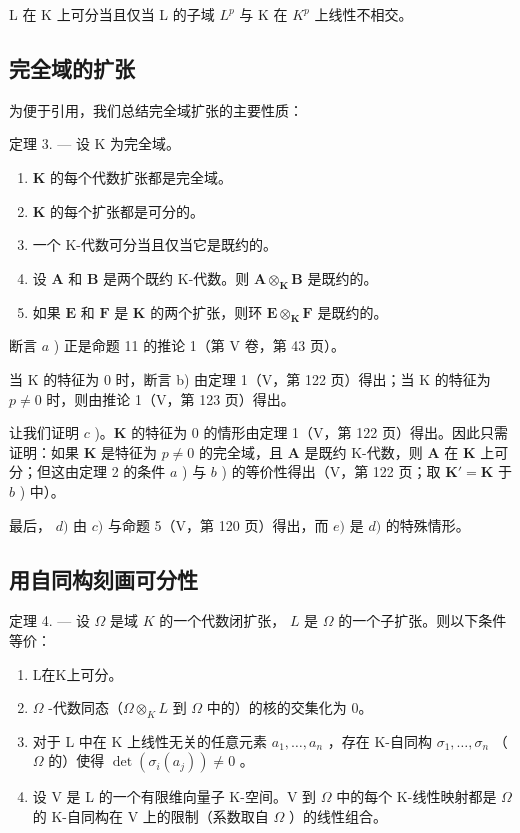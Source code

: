 L 在 K 上可分当且仅当 L 的子域 \(L^{p}\) 与 K 在 \(K^{p}\) 上线性不相交。

\subsection{完全域的扩张}

为便于引用，我们总结完全域扩张的主要性质：

定理 3. --- 设 K 为完全域。

\begin{enumerate}
\def\labelenumi{\alph{enumi})}
\item
  \(\mathbf{K}\) 的每个代数扩张都是完全域。
\item
  \(\mathbf{K}\) 的每个扩张都是可分的。
\item
  一个 K-代数可分当且仅当它是既约的。
\item
  设 \(\mathbf{A}\) 和 \(\mathbf{B}\) 是两个既约 K-代数。则 \(\mathbf{A} \otimes_{\mathbf{K}} \mathbf{B}\) 是既约的。
\item
  如果 \(\mathbf{E}\) 和 \(\mathbf{F}\) 是 \(\mathbf{K}\) 的两个扩张，则环 \(\mathbf{E} \otimes_{\mathbf{K}} \mathbf{F}\) 是既约的。
\end{enumerate}

断言 \(a\) ) 正是命题 11 的推论 1（第 V 卷，第 43 页）。

当 K 的特征为 0 时，断言 b) 由定理 1（V，第 122 页）得出；当 K 的特征为 \(p \neq 0\) 时，则由推论 1（V，第 123 页）得出。

让我们证明 \(c\) )。\(\mathbf{K}\) 的特征为 0 的情形由定理 1（V，第 122 页）得出。因此只需证明：如果 \(\mathbf{K}\) 是特征为 \(p \neq 0\) 的完全域，且 \(\mathbf{A}\) 是既约 K-代数，则 \(\mathbf{A}\) 在 \(\mathbf{K}\) 上可分；但这由定理 2 的条件 \(a\) ) 与 \(b\) ) 的等价性得出（V，第 122 页；取 \(\mathbf{K}' = \mathbf{K}\) 于 \(b\) ) 中）。

最后， \(d)\) 由 \(c)\) 与命题 5（V，第 120 页）得出，而 \(e)\) 是 \(d)\) 的特殊情形。

\subsection{用自同构刻画可分性}

定理 4. --- 设 \(\Omega\) 是域 \(K\) 的一个代数闭扩张， \(L\) 是 \(\Omega\) 的一个子扩张。则以下条件等价：

\begin{enumerate}
\def\labelenumi{\alph{enumi})}
\item
  L在K上可分。
\item
  \(\Omega\) -代数同态（\(\Omega \otimes_{K} L\) 到 \(\Omega\) 中的）的核的交集化为 0。
\item
  对于 L 中在 K 上线性无关的任意元素 \(a_1, \ldots, a_n\) ，存在 K-自同构 \(\sigma_1, \ldots, \sigma_n\) （\(\Omega\) 的）使得 \(\det(\sigma_i(a_j)) \neq 0\) 。
\item
  设 V 是 L 的一个有限维向量子 K-空间。V 到 \(\Omega\) 中的每个 K-线性映射都是 \(\Omega\) 的 K-自同构在 V 上的限制（系数取自 \(\Omega\) ）的线性组合。
\end{enumerate}

